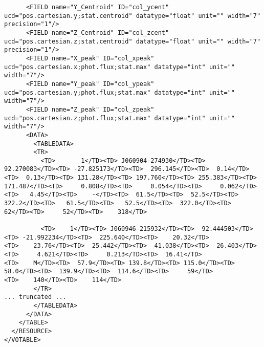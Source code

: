 {\begin{verbatim}
      <FIELD name="Y_Centroid" ID="col_ycent" ucd="pos.cartesian.y;stat.centroid" datatype="float" unit="" width="7" precision="1"/>
      <FIELD name="Z_Centroid" ID="col_zcent" ucd="pos.cartesian.z;stat.centroid" datatype="float" unit="" width="7" precision="1"/>
      <FIELD name="X_peak" ID="col_xpeak" ucd="pos.cartesian.x;phot.flux;stat.max" datatype="int" unit="" width="7"/>
      <FIELD name="Y_peak" ID="col_ypeak" ucd="pos.cartesian.y;phot.flux;stat.max" datatype="int" unit="" width="7"/>
      <FIELD name="Z_peak" ID="col_zpeak" ucd="pos.cartesian.z;phot.flux;stat.max" datatype="int" unit="" width="7"/>
      <DATA>
        <TABLEDATA>
        <TR>
          <TD>       1</TD><TD> J060904-274930</TD><TD>  92.270083</TD><TD> -27.825173</TD><TD>  296.145</TD><TD>  0.14</TD>
<TD>  0.13</TD><TD> 131.28</TD><TD> 197.760</TD><TD> 255.383</TD><TD> 171.487</TD><TD>     0.808</TD><TD>     0.054</TD><TD>     0.062</TD><TD>   4.45</TD><TD>    -</TD><TD>  61.5</TD><TD>  52.5</TD><TD>  322.2</TD><TD>   61.5</TD><TD>   52.5</TD><TD>  322.0</TD><TD>     62</TD><TD>     52</TD><TD>    318</TD>

          <TD>    1</TD><TD> J060946-215932</TD><TD>  92.444503</TD><TD> -21.992234</TD><TD>  225.640</TD><TD>    20.32</TD>
<TD>    23.76</TD><TD>  25.442</TD><TD>  41.038</TD><TD>  26.403</TD><TD>     4.621</TD><TD>     0.213</TD><TD>  16.41</TD>
<TD>    M</TD><TD>  57.9</TD><TD> 139.8</TD><TD> 115.0</TD><TD>   58.0</TD><TD>  139.9</TD><TD>  114.6</TD><TD>     59</TD>
<TD>    140</TD><TD>    114</TD>
        </TR>
... truncated ...
        </TABLEDATA>
      </DATA>
    </TABLE>
  </RESOURCE>
</VOTABLE>
  \end{verbatim}
}

